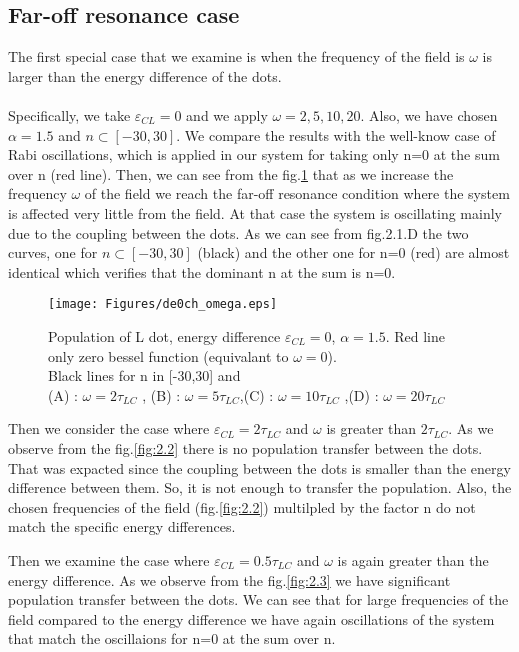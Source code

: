 \subsection{Far-off resonance case}

The first special case that we examine is when the frequency of the field is $\omega$ is larger than the energy difference of the dots. \\
\\
Specifically, we take $\varepsilon_{CL}=0$ and we apply $\omega=2,5,10,20$. Also, we have chosen $\alpha=1.5$ and $n \subset \left[ -30,30\right]$. We compare the results with the well-know case of Rabi oscillations, which is applied in our system for taking only n=0 at the sum over n (red line). 
Then,  we can see  from the fig.\ref{fig:2.1} that as we increase the frequency $\omega$ of the field we reach the far-off resonance condition where the system is affected very little from the field. At that case the system is oscillating mainly due to the coupling between the dots. As we can see from fig.2.1.D the two curves, one for $n \subset \left[ -30,30\right]$ (black) and the other one for n=0 (red)  are almost identical which verifies that the dominant n at the sum is n=0.


\begin{figure}
\centering
\texttt{[image: Figures/de0ch\_omega.eps]}
\decoRule
\caption[Far-off resonance]{Population of L dot, energy difference $\varepsilon_{CL}=0$, $\alpha=1.5$. Red line only zero bessel function (equivalant to $\omega=0$). \\Black lines for n in [-30,30] and \\ (A) : $\omega=2\tau_{LC}$ , (B) : $\omega=5\tau_{LC}$,(C) : $\omega=10\tau_{LC}$ ,(D) : $\omega=20\tau_{LC}$}
\label{fig:2.1}
\end{figure}

Then we consider the case where $\varepsilon_{CL}=2\tau_{LC}$ and $\omega$ is greater than $2\tau_{LC}$. As we observe from the fig.\ref{fig:2.2} there is no population transfer between the dots. That was expacted since the coupling between the dots is smaller than the energy difference between them. So, it is not enough to transfer the population. Also, the chosen frequencies of the field (fig.\ref{fig:2.2}) multilpled by the factor n do not match the specific energy differences.

Then we examine the case where $\varepsilon_{CL}=0.5\tau_{LC}$ and $\omega$ is again greater than the energy difference. As we observe from the fig.\ref{fig:2.3} we have significant population transfer between the dots. We can see that for large frequencies of the field compared to the energy difference we have again oscillations of the system that match the oscillaions for n=0 at the sum over n. 

